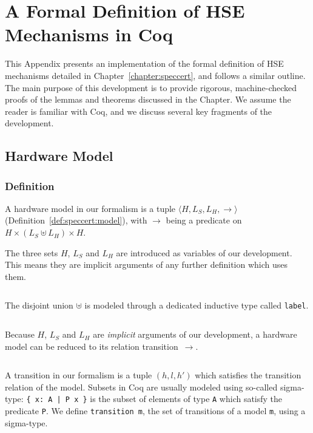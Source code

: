 \chapter{A Formal Definition of HSE Mechanisms in Coq}
\label{appendix:speccert}

This Appendix presents an implementation of the formal definition of HSE
mechanisms detailed in Chapter~\ref{chapter:speccert}, and follows a similar
outline.
%
The main purpose of this development is to provide rigorous, machine-checked
proofs of the lemmas and theorems discussed in the Chapter.
%
We assume the reader is familiar with Coq, and we discuss several key fragments
of the development.

\section{Hardware Model}

\subsection{Definition}

A hardware model in our formalism is a tuple
$\langle H, L_S, L_H, \rightarrow \rangle$
(Definition~\ref{def:speccert:model}), with $\rightarrow$ being a predicate on
$H \times (L_S \uplus L_H) \times H$.

The three sets $H$, $L_S$ and $L_H$ are introduced as variables of our
development.
%
This means they are implicit arguments of any further definition which uses
them.

\inputminted[gobble=2,firstline=2,lastline=2]{coq}{Listings/SpecCert.v}

The disjoint union $\uplus$ is modeled through a dedicated inductive type
called \texttt{label}.

\inputminted[gobble=2,firstline=4,lastline=8]{coq}{Listings/SpecCert.v}

Because $H$, $L_S$ and $L_H$ are \emph{implicit} arguments of our development, a
hardware model can be reduced to its relation transition~$\rightarrow$.

\inputminted[gobble=2,firstline=10,lastline=12]{coq}{Listings/SpecCert.v}

A transition in our formalism is a tuple $(h, l, h')$ which satisfies the
transition relation of the model.
%
Subsets in Coq are usually modeled using so-called sigma-type:
%
\texttt{\{ x: A | P x \}} is the subset of elements of type \texttt{A} which
satisfy the predicate \texttt{P}.
%
We define \texttt{transition m}, the set of transitions of a model \texttt{m},
using a sigma-type.

